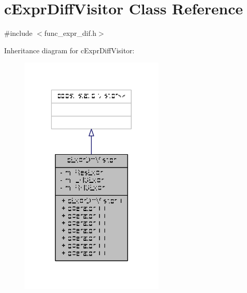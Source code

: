 \hypertarget{classcExprDiffVisitor}{\section{c\-Expr\-Diff\-Visitor Class Reference}
\label{classcExprDiffVisitor}
}


{\ttfamily \#include $<$func\-\_\-expr\-\_\-dif.\-h$>$}



Inheritance diagram for c\-Expr\-Diff\-Visitor\-:
\nopagebreak
\begin{figure}[H]
\begin{center}
\leavevmode
\includegraphics[width=196pt]{classcExprDiffVisitor__inherit__graph}
\end{center}
\end{figure}


